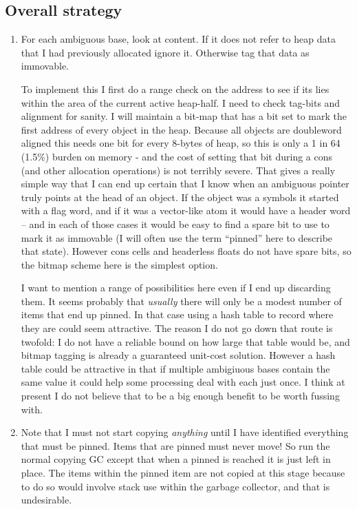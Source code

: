 \subsection{Overall strategy}
\begin{enumerate}
\item For each ambiguous base, look at content. If it does not refer to
heap data that I had previously allocated ignore it. Otherwise
tag that data as immovable.

To implement this I first do a range check on the address to see if its
lies within the area of the current active heap-half. I need to check
tag-bits and alignment for sanity. I will maintain a bit-map that has
a bit set to mark the first address of every object in the heap. Because
all objects are doubleword aligned this needs one bit for every 8-bytes
of heap, so this is only a 1 in 64 (1.5\%) burden on memory - and the cost
of setting that bit during a {\tx cons} (and other allocation operations) is
not terribly severe. That gives a really simple way that I can end up
certain that I know when an ambiguous pointer truly points at the head
of an object. If the object was a symbols it started with a flag word,
and if it was a vector-like atom it would have a header word -- and in each
of those cases it would be easy to find a spare bit to use to mark it
as immovable (I will often use the term ``pinned'' here to describe that
state). However cons cells and headerless floats do not have spare bits,
so the bitmap scheme here is the simplest option.

I want to mention a range of possibilities here even if I end up discarding
them. It seems probably that {\em usually} there will only be a modest
number of items that end up pinned. In that case using a hash table to
record where they are could seem attractive. The reason I do not go down
that route is twofold: I do not have a reliable bound on how large that
table would be, and bitmap tagging is already a guaranteed unit-cost solution.
However a hash table could be attractive in that if multiple ambigiuous
bases contain the same value it could help some processing deal with each
just once. I think at present I do not believe that to be a big enough
benefit to be worth fussing with.


\item  Note that I must not start copying {\em anything} until I have
identified
everything that must be pinned. Items that are pinned
must never move! So run the normal copying GC except that when a
pinned is reached it is just left in place. The items within
the pinned item are not copied at this stage because to do so would
involve stack use within the garbage collector, and that is undesirable.


\end{enumerate}
